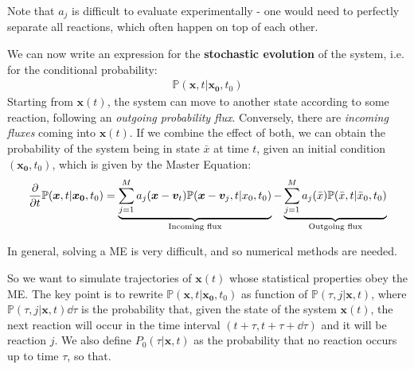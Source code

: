 \documentclass[../template.tex]{subfiles}
\begin{document}
\medskip

Note that $a_j$ is difficult to evaluate experimentally - one would need to perfectly separate all reactions, which often happen on top of each other.

\medskip

We can now write an expression for the \textbf{stochastic evolution} of the system, i.e. for the conditional probability:
\begin{align*}
    \mathbb{P}(\bm{x}, t|\bm{x_0}, t_0)
\end{align*} 
Starting from $\bm{x}(t)$, the system can move to another state according to some reaction, following an \textit{outgoing probability flux}. Conversely, there are \textit{incoming fluxes} coming into $\bm{x}(t)$. If we combine the effect of both, we can obtain the probability of the system being in state $\bar{x}$ at time $t$, given an initial condition $(\bm{x_0}, t_0)$, which is given by the Master Equation:
\begin{align*}
    \pdv{t} \mathbb{P}(\bm{x},t|\bm{x_0},t_0) = \underbrace{\sum_{j=1}^M a_j (\bm{x} - \bm{v}_t) \mathbb{P}(\bm{x}-\bm{v}_j,t|x_0,t_0)}_{\text{Incoming flux}} - \underbrace{\sum_{j=1}^M a_j(\bar{x}) \mathbb{P}(\bar{x}, t|\bar{x}_0, t_0)}_{\text{Outgoing flux}}  
\end{align*}

In general, solving a ME is very difficult, and so numerical methods are needed. 

So we want to simulate trajectories of $\bm{x}(t)$ whose statistical properties obey the ME. The key point is to rewrite $\mathbb{P}(\bm{x},t|\bm{x_0},t_0)$ as function of $\mathbb{P}(\tau,j|\bm{x},t)$, where $\mathbb{P}(\tau, j|\bm{x},t)\dd{\tau}$ is the probability that, given the state of the system $\bm{x}(t)$, the next reaction will occur in the time interval $(t+\tau, t+\tau + \dd{\tau})$ and it will be reaction $j$. We also define $P_0(\tau|\bm{x},t)$ as the probability that no reaction occurs up to time $\tau$, so that.
\end{document}

